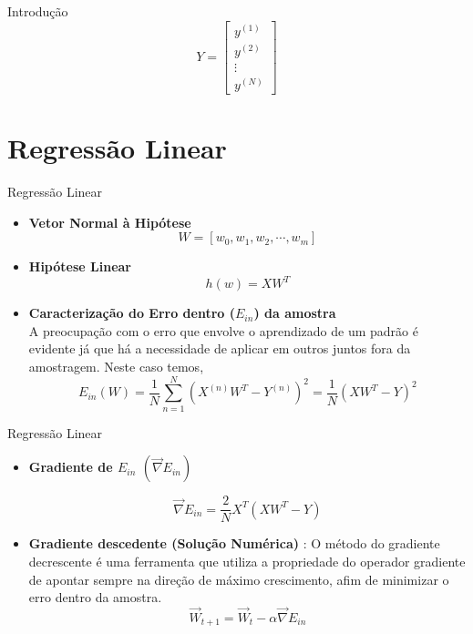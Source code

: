 \documentclass{beamer}
\begin{document}
  \begin{frame}{Introdução} 
  	\begin{equation}
  	Y = \left[
    	\begin{array}{rrcrr}
    	y^{(1)}\\
        y^{(2)}\\
        \vdots \\
        y^{(N)}
    	\end{array}
    	\right]
  	\end{equation}
  \end{frame}

\section{Regressão Linear}

\begin{frame}{Regressão Linear}

\begin{itemize}
  \item \textbf{Vetor Normal à Hipótese}
  \begin{equation}
  W = \left[w_0, w_1, w_2, \cdots, w_m\right]
  \end{equation}
  \item \textbf{Hipótese Linear}
 \begin{equation}
 h(w) = X W^T
 \end{equation}
 
 \item \textbf{Caracterização do Erro dentro ($E_{in}$) da amostra}\\
 A preocupação com o erro que envolve o aprendizado de um padrão é evidente já que há a necessidade de aplicar em outros juntos fora da amostragem. Neste caso temos,  
\begin{equation}
E_{in}(W) = \frac{1}{N} \sum_{n = 1}^N \left( X^{(n)}  W^T - Y^{(n)} \right)^2 = \frac{1}{N} \left( XW^T -Y\right)^2 
\end{equation}
\end{itemize}
\end{frame}



\begin{frame}{Regressão Linear}
\begin{itemize}
\item \textbf{Gradiente de $E_{in}$ $\left(\vec{\nabla} E_{in}\right)$}

\begin{equation}
\vec{\nabla} E_{in} = \frac{2}{N} X^T \left( XW^T - Y \right)
\end{equation}
 \item  \textbf{ Gradiente descedente (Solução Numérica)} : O método do gradiente decrescente é uma ferramenta que utiliza a propriedade do operador gradiente de apontar sempre na direção de máximo crescimento, afim de minimizar o erro dentro da amostra.
 \begin{equation}
 \vec{W}_{t+1} = \vec{W}_t -  \alpha \vec{\nabla} E_{in}
 \end{equation}
\end{itemize}
\end{frame} 
\end{document}
